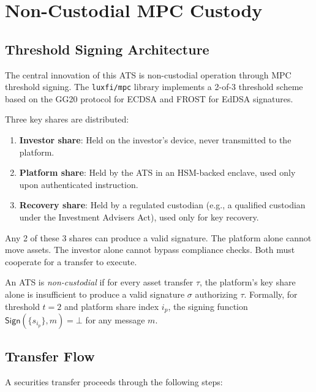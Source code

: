 \section{Non-Custodial MPC Custody}
\label{sec:mpc}

\subsection{Threshold Signing Architecture}

The central innovation of this ATS is non-custodial operation through MPC threshold signing. The \texttt{luxfi/mpc} library implements a 2-of-3 threshold scheme based on the GG20 protocol for ECDSA and FROST for EdDSA signatures.

Three key shares are distributed:

\begin{enumerate}[nosep]
  \item \textbf{Investor share}: Held on the investor's device, never transmitted to the platform.
  \item \textbf{Platform share}: Held by the ATS in an HSM-backed enclave, used only upon authenticated instruction.
  \item \textbf{Recovery share}: Held by a regulated custodian (e.g., a qualified custodian under the Investment Advisers Act), used only for key recovery.
\end{enumerate}

Any 2 of these 3 shares can produce a valid signature. The platform alone cannot move assets. The investor alone cannot bypass compliance checks. Both must cooperate for a transfer to execute.

\begin{definition}
An ATS is \emph{non-custodial} if for every asset transfer $\tau$, the platform's key share alone is insufficient to produce a valid signature $\sigma$ authorizing $\tau$. Formally, for threshold $t = 2$ and platform share index $i_p$, the signing function $\textsf{Sign}(\{s_{i_p}\}, m) = \bot$ for any message $m$.
\end{definition}

\subsection{Transfer Flow}

A securities transfer proceeds through the following steps:

